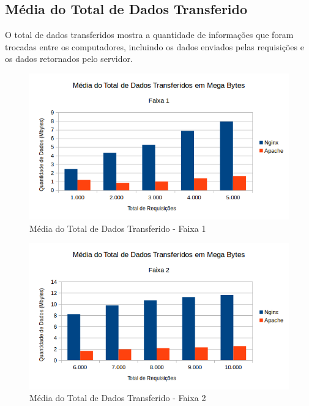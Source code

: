 \subsection{Média do Total de Dados Transferido}
O total de dados transferidos mostra a quantidade de informações que foram 
trocadas entre os computadores, incluindo os dados enviados pelas requisições e 
os dados retornados pelo servidor.\\
\begin{figure}[H]
	\centering
	\includegraphics[width=1\linewidth]{graficos/grafico2-f1} 
	\caption{Média do Total de Dados Transferido - Faixa 1}
	\label{fig:grafico2-f1}
\end{figure}

\begin{figure}[H]
	\centering
	\includegraphics[width=1\linewidth]{graficos/grafico2-f2} 
	\caption{Média do Total de Dados Transferido - Faixa 2}
	\label{fig:grafico2-f2}
\end{figure}

